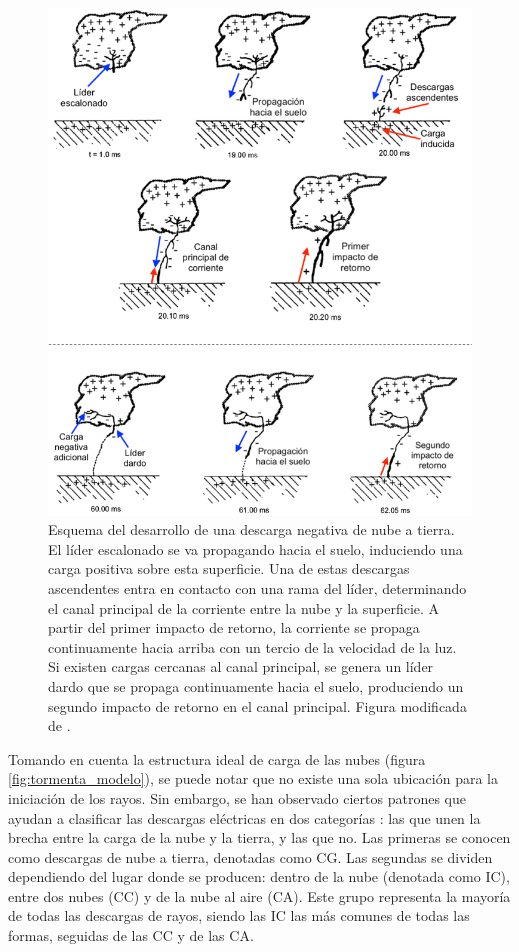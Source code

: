 \documentclass[11pt,oneside,openany,letter]{book}
\begin{document}
\begin{figure}
    \centering
    \includegraphics[scale=0.8]{figures/cg_development.png}
    \caption[Desarrollo de una descarga negativa de nube a tierra]{Esquema del desarrollo de una descarga negativa de nube a tierra. El l\'ider escalonado se va propagando hacia el suelo, induciendo una carga positiva sobre esta superficie. Una de estas descargas ascendentes entra en contacto con una rama del líder, determinando el canal principal de la corriente entre la nube y la superficie. A partir del primer impacto de retorno, la corriente se propaga continuamente hacia arriba con un tercio de la velocidad de la luz. Si existen cargas cercanas al canal principal, se genera un líder dardo que se propaga continuamente hacia el suelo, produciendo un segundo impacto de retorno en el canal principal. Figura modificada de \cite{DwyerUman2014}.}
    \label{fig:cg_development}
\end{figure}

Tomando en cuenta la estructura ideal de carga de las nubes (figura \ref{fig:tormenta_modelo}), se puede notar que no existe una sola ubicación para la iniciación de los rayos. Sin embargo, se han observado ciertos patrones que ayudan a clasificar las descargas eléctricas en dos categorías \cite{DwyerUman2014}: las que unen la brecha entre la carga de la nube y la tierra, y las que no. Las primeras se conocen como descargas de nube a tierra, denotadas como CG. Las segundas se dividen dependiendo del lugar donde se producen: dentro de la nube (denotada como IC), entre dos nubes (CC) y de la nube al aire (CA). Este grupo representa la mayoría de todas las descargas de rayos, siendo las IC las más comunes de todas las formas, seguidas de las CC y de las CA. 
\end{document}
